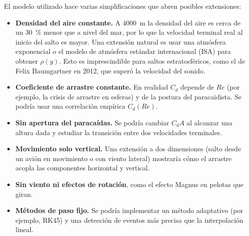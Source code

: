 El modelo utilizado hace varias simplificaciones que abren posibles extensiones:
\begin{itemize}
  \item \textbf{Densidad del aire constante.} A \qty{4000}{m} la densidad del aire es cerca de un \qty{30}{\percent} menor que a nivel del mar, por lo que la velocidad terminal real al inicio del salto es mayor. Una extensión natural es usar una atmósfera exponencial o el modelo de atmósfera estándar internacional (ISA) para obtener $\rho(y)$. Esto es imprescindible para saltos estratosféricos, como el de Felix Baumgartner en 2012, que superó la velocidad del sonido.
  \item \textbf{Coeficiente de arrastre constante.} En realidad $C_d$ depende de $Re$ (por ejemplo, la crisis de arrastre en esferas) y de la postura del paracaidista. Se podría usar una correlación empírica $C_d(Re)$.
  \item \textbf{Sin apertura del paracaídas.} Se podría cambiar $C_d A$ al alcanzar una altura dada y estudiar la transición entre dos velocidades terminales.
  \item \textbf{Movimiento solo vertical.} Una extensión a dos dimensiones (salto desde un avión en movimiento o con viento lateral) mostraría cómo el arrastre acopla las componentes horizontal y vertical.
  \item \textbf{Sin viento ni efectos de rotación}, como el efecto Magnus en pelotas que giran.
  \item \textbf{Métodos de paso fijo.} Se podría implementar un método adaptativo (por ejemplo, RK45) y una detección de eventos más precisa que la interpolación lineal.
\end{itemize}

